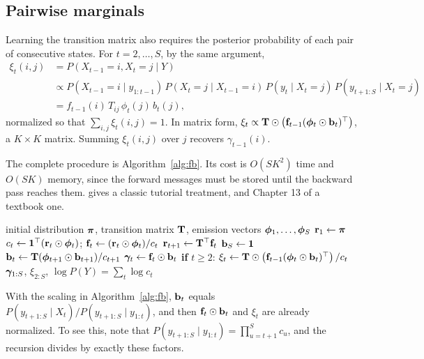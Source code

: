\subsection{Pairwise marginals}

Learning the transition matrix also requires the posterior probability of each pair of consecutive states. For $t=2,\dots,S$, by the same argument,
\begin{align}
  \xi_t(i,j) &= P(X_{t-1}=i,X_t=j\mid Y) \nonumber\\
  &\propto P(X_{t-1}=i\mid y_{1:t-1})\,P(X_t=j\mid X_{t-1}=i)\,P(y_t\mid X_t=j)\,P(y_{t+1:S}\mid X_t=j) \nonumber\\
  &= f_{t-1}(i)\,T_{ij}\,\phi_t(j)\,b_t(j),
  \label{eq:xi}
\end{align}
normalized so that $\sum_{i,j}\xi_t(i,j)=1$. In matrix form, $\xi_t\propto\mathbf{T}\odot\left(\mathbf{f}_{t-1}(\boldsymbol{\phi}_t\odot\mathbf{b}_t)^\top\right)$, a $K\times K$ matrix. Summing $\xi_t(i,j)$ over $j$ recovers $\gamma_{t-1}(i)$.

The complete procedure is Algorithm~\ref{alg:fb}. Its cost is $O(SK^2)$ time and $O(SK)$ memory, since the forward messages must be stored until the backward pass reaches them. \citet{rabiner1989} gives a classic tutorial treatment, and Chapter 13 of \citet{bishop2006} a textbook one.

\begin{algorithm}[tbp]
  \caption{Forward-backward algorithm}
  \label{alg:fb}
  \begin{algorithmic}[1]
    \Require initial distribution $\boldsymbol{\pi}$, transition matrix $\mathbf{T}$, emission vectors $\boldsymbol{\phi}_1,\dots,\boldsymbol{\phi}_S$
    \State $\mathbf{r}_1\gets\boldsymbol{\pi}$
     
      \State $c_t\gets\mathbf{1}^\top(\mathbf{r}_t\odot\boldsymbol{\phi}_t)$; \quad $\mathbf{f}_t\gets(\mathbf{r}_t\odot\boldsymbol{\phi}_t)/c_t$
      \State $\mathbf{r}_{t+1}\gets\mathbf{T}^\top\mathbf{f}_t$
    \EndFor
    \State $\mathbf{b}_S\gets\mathbf{1}$
     
      \State $\mathbf{b}_t\gets\mathbf{T}(\boldsymbol{\phi}_{t+1}\odot\mathbf{b}_{t+1})/c_{t+1}$
    \EndFor
      \State $\boldsymbol{\gamma}_t\gets\mathbf{f}_t\odot\mathbf{b}_t$ 
      \State \textbf{if} $t\geq 2$: $\xi_t\gets\mathbf{T}\odot\left(\mathbf{f}_{t-1}(\boldsymbol{\phi}_t\odot\mathbf{b}_t)^\top\right)/c_t$
    \EndFor
    \State \Return $\boldsymbol{\gamma}_{1:S}$, $\xi_{2:S}$, $\log P(Y)=\sum_t\log c_t$
  \end{algorithmic}
\end{algorithm}

With the scaling in Algorithm~\ref{alg:fb}, $\mathbf{b}_t$ equals $P(y_{t+1:S}\mid X_t)/P(y_{t+1:S}\mid y_{1:t})$, and then $\mathbf{f}_t\odot\mathbf{b}_t$ and $\xi_t$ are already normalized. To see this, note that $P(y_{t+1:S}\mid y_{1:t})=\prod_{u=t+1}^S c_u$, and the recursion divides by exactly these factors.

